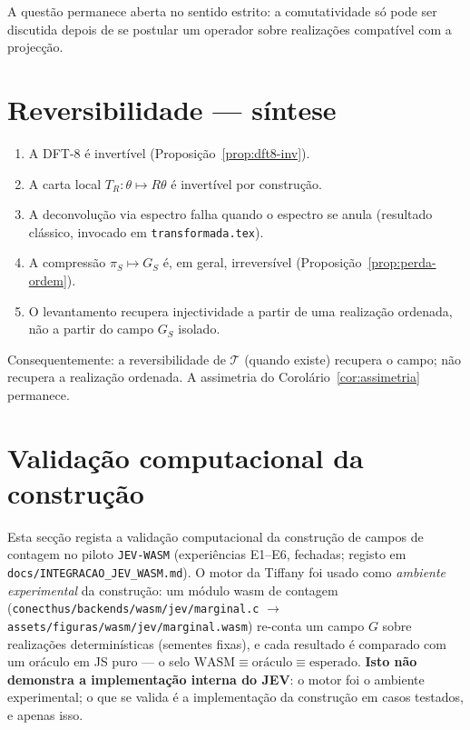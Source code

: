 \documentclass[11pt,a4paper]{article}
\begin{document}
A questão permanece aberta no sentido estrito: a comutatividade só pode ser discutida depois de se postular um operador sobre realizações compatível com a projecção.

\section{Reversibilidade --- síntese}

\begin{enumerate}[leftmargin=1.5em]
\item A DFT-8 é invertível (Proposição~\ref{prop:dft8-inv}).
\item A carta local \(T_R\colon\theta\mapsto R\theta\) é invertível por construção.
\item A deconvolução via espectro falha quando o espectro se anula (resultado clássico, invocado em \texttt{transformada.tex}).
\item A compressão \(\pi_S\mapsto G_S\) é, em geral, irreversível (Proposição~\ref{prop:perda-ordem}).
\item O levantamento recupera injectividade a partir de uma realização ordenada, não a partir do campo \(G_S\) isolado.
\end{enumerate}

Consequentemente: a reversibilidade de \(\mathcal T\) (quando existe) recupera o campo; não recupera a realização ordenada. A assimetria do Corolário~\ref{cor:assimetria} permanece.

\section{Validação computacional da construção}

Esta secção regista a validação computacional da construção de campos de
contagem no piloto \texttt{JEV-WASM} (experiências E1--E6, fechadas; registo em
\texttt{docs/INTEGRACAO\_JEV\_WASM.md}). O motor da Tiffany foi usado como
\emph{ambiente experimental} da construção: um módulo wasm de contagem
(\texttt{conecthus/backends/wasm/jev/marginal.c}
\(\to\) \texttt{assets/figuras/wasm/jev/marginal.wasm}) re-conta um campo \(G\)
sobre realizações determinísticas (sementes fixas), e cada resultado é
comparado com um oráculo em JS puro --- o selo
\(\text{WASM}\equiv\text{oráculo}\equiv\text{esperado}\). \textbf{Isto não
demonstra a implementação interna do JEV}: o motor foi o ambiente experimental;
o que se valida é a implementação da construção em casos testados, e apenas
isso.
\end{document}
